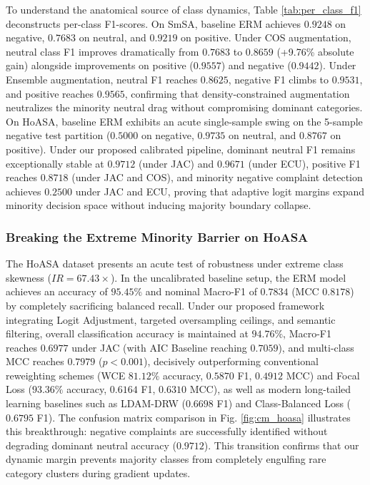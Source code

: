 \documentclass{ieeeaccess}
\begin{document}
To understand the anatomical source of class dynamics, Table \ref{tab:per_class_f1} deconstructs per-class F1-scores. On SmSA, baseline ERM achieves $0.9248$ on negative, $0.7683$ on neutral, and $0.9219$ on positive. Under COS augmentation, neutral class F1 improves dramatically from $0.7683$ to \textbf{$0.8659$} (+9.76\% absolute gain) alongside improvements on positive (\textbf{$0.9557$}) and negative (\textbf{$0.9442$}). Under Ensemble augmentation, neutral F1 reaches \textbf{$0.8625$}, negative F1 climbs to \textbf{$0.9531$}, and positive reaches \textbf{$0.9565$}, confirming that density-constrained augmentation neutralizes the minority neutral drag without compromising dominant categories. On HoASA, baseline ERM exhibits an acute single-sample swing on the 5-sample negative test partition ($0.5000$ on negative, $0.9735$ on neutral, and $0.8767$ on positive). Under our proposed calibrated pipeline, dominant neutral F1 remains exceptionally stable at \textbf{$0.9712$} (under JAC) and \textbf{$0.9671$} (under ECU), positive F1 reaches \textbf{$0.8718$} (under JAC and COS), and minority negative complaint detection achieves \textbf{$0.2500$} under JAC and ECU, proving that adaptive logit margins expand minority decision space without inducing majority boundary collapse.

\subsubsection{Breaking the Extreme Minority Barrier on HoASA}
The HoASA dataset presents an acute test of robustness under extreme class skewness ($IR = 67.43\times$). In the uncalibrated baseline setup, the ERM model achieves an accuracy of $95.45\%$ and nominal Macro-F1 of $0.7834$ (MCC $0.8178$) by completely sacrificing balanced recall. Under our proposed framework integrating Logit Adjustment, targeted oversampling ceilings, and semantic filtering, overall classification accuracy is maintained at \textbf{$94.76\%$}, Macro-F1 reaches \textbf{$0.6977$} under JAC (with AIC Baseline reaching \textbf{$0.7059$}), and multi-class MCC reaches \textbf{$0.7979$} ($p < 0.001$), decisively outperforming conventional reweighting schemes (WCE $81.12\%$ accuracy, $0.5870$ F1, $0.4912$ MCC) and Focal Loss ($93.36\%$ accuracy, $0.6164$ F1, $0.6310$ MCC), as well as modern long-tailed learning baselines such as LDAM-DRW ($0.6698$ F1) and Class-Balanced Loss ($0.6795$ F1). The confusion matrix comparison in Fig. \ref{fig:cm_hoasa} illustrates this breakthrough: negative complaints are successfully identified without degrading dominant neutral accuracy ($0.9712$). This transition confirms that our dynamic margin prevents majority classes from completely engulfing rare category clusters during gradient updates.
\end{document}
